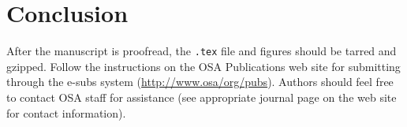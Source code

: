 \documentclass[letterpaper,12pt]{article}   %
\begin{document}
\section{Conclusion}

After the manuscript is proofread, the \texttt{.tex} file and figures
should be tarred and gzipped.  Follow the instructions on the OSA
Publications web site for submitting through the e-subs system
(\href{http://www.osa/org/pubs}{http://www.osa/org/pubs}). Authors should feel free to
contact OSA staff for assistance (see appropriate journal page on
the web site for contact information).




\end{document}
